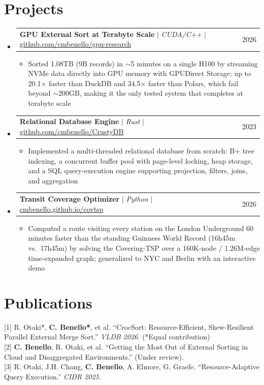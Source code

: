 \documentclass[letterpaper,10pt]{article}
\makeatletter
\newcommand{\resumeItem}[1]{
  \item\small{
    {#1 \vspace{-3pt}}
  }
}
\newcommand{\resumeProjectHeading}[2]{
    \item
    \begin{tabular*}{0.99\textwidth}{l@{\extracolsep{\fill}}r}
      \small#1 & #2 \\
    \end{tabular*}\vspace{-8pt}
}
\newcommand{\resumeSubHeadingListStart}{\begin{itemize}[leftmargin=0.015in, label={}]}
\newcommand{\resumeSubHeadingListEnd}{\end{itemize}}
\newcommand{\resumeItemListStart}{\begin{itemize}[leftmargin=0.15in]}
\newcommand{\resumeItemListEnd}{\end{itemize}\vspace{-7pt}}
\makeatother
\begin{document}
\section{Projects}
    \resumeSubHeadingListStart
      \resumeProjectHeading
          {\textbf{GPU External Sort at Terabyte Scale} $|$ \emph{CUDA/C++} $|$ \small{\href{https://github.com/cmbenello/gpu-research}{github.com/cmbenello/gpu-research}}}{2026}
          \resumeItemListStart
            \resumeItem{Sorted 1.08TB (9B records) in $\sim$5 minutes on a single H100 by streaming NVMe data directly into GPU memory with GPUDirect Storage; up to 20.1$\times$ faster than DuckDB and 34.5$\times$ faster than Polars, which fail beyond $\sim$200GB, making it the only tested system that completes at terabyte scale}
          \resumeItemListEnd
      \resumeProjectHeading
          {\textbf{Relational Database Engine} $|$ \emph{Rust} $|$ \small{\href{https://github.com/cmbenello/CrustyDB}{github.com/cmbenello/CrustyDB}}}{2023}
          \resumeItemListStart
            \resumeItem{Implemented a multi-threaded relational database from scratch: B+ tree indexing, a concurrent buffer pool with page-level locking, heap storage, and a SQL query-execution engine supporting projection, filters, joins, and aggregation}
          \resumeItemListEnd
      \resumeProjectHeading
          {\textbf{Transit Coverage Optimizer} $|$ \emph{Python} $|$ \small{\href{https://cmbenello.github.io/covtsp}{cmbenello.github.io/covtsp}}}{2026}
          \resumeItemListStart
            \resumeItem{Computed a route visiting every station on the London Underground 60 minutes faster than the standing Guinness World Record (16h45m vs.\ 17h45m) by solving the Covering-TSP over a 160K-node / 1.26M-edge time-expanded graph; generalized to NYC and Berlin with an interactive demo}
          \resumeItemListEnd
    \resumeSubHeadingListEnd

\section{Publications}
 \begin{itemize}[leftmargin=0.015in, label={}]
    \small{\item{
     {[1] R. Otaki*, \textbf{C. Benello*}, et al. ``CrocSort: Resource-Efficient, Skew-Resilient Parallel External Merge Sort.'' \textit{VLDB 2026.} (*Equal contribution)} \\
     {[2] \textbf{C. Benello}, R. Otaki, et al. ``Getting the Most Out of External Sorting in Cloud and Disaggregated Environments.'' (Under review).} \\
     {[3] R. Otaki, J.H. Chang, \textbf{C. Benello}, A. Elmore, G. Graefe. ``Resource-Adaptive Query Execution.'' \textit{CIDR 2025.}}
    }}
 \end{itemize}\vspace{-9pt}
\end{document}
